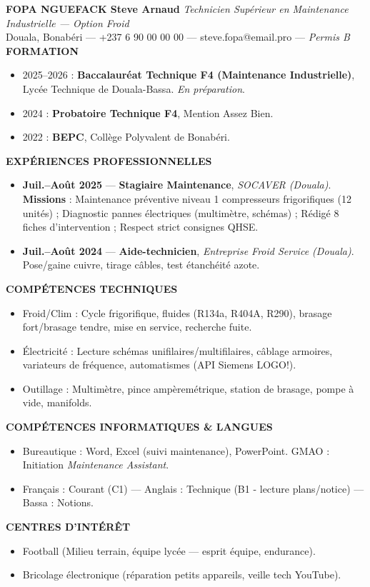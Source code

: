 \documentclass[11pt]{article}
\begin{document}
\begin{exemplebox}
\textbf{FOPA NGUEFACK Steve Arnaud} \hfill \textit{Technicien Supérieur en Maintenance Industrielle — Option Froid}\\
Douala, Bonabéri — +237 6 90 00 00 00 — steve.fopa@email.pro — \textit{Permis B} \\[4pt]
\textbf{FORMATION}
\begin{itemize}
\item 2025--2026 : \textbf{Baccalauréat Technique F4 (Maintenance Industrielle)}, Lycée Technique de Douala-Bassa. \textit{En préparation}.
\item 2024 : \textbf{Probatoire Technique F4}, Mention Assez Bien.
\item 2022 : \textbf{BEPC}, Collège Polyvalent de Bonabéri.
\end{itemize}
\textbf{EXPÉRIENCES PROFESSIONNELLES}
\begin{itemize}
\item \textbf{Juil.--Août 2025} — \textbf{Stagiaire Maintenance}, \textit{SOCAVER (Douala)}. \textbf{Missions} : Maintenance préventive niveau 1 compresseurs frigorifiques (12 unités) ; Diagnostic pannes électriques (multimètre, schémas) ; Rédigé 8 fiches d'intervention ; Respect strict consignes QHSE.
\item \textbf{Juil.--Août 2024} — \textbf{Aide-technicien}, \textit{Entreprise Froid Service (Douala)}. Pose/gaine cuivre, tirage câbles, test étanchéité azote.
\end{itemize}
\textbf{COMPÉTENCES TECHNIQUES}
\begin{itemize}
\item Froid/Clim : Cycle frigorifique, fluides (R134a, R404A, R290), brasage fort/brasage tendre, mise en service, recherche fuite.
\item Électricité : Lecture schémas unifilaires/multifilaires, câblage armoires, variateurs de fréquence, automatismes (API Siemens LOGO!).
\item Outillage : Multimètre, pince ampèremétrique, station de brasage, pompe à vide, manifolds.
\end{itemize}
\textbf{COMPÉTENCES INFORMATIQUES \& LANGUES}
\begin{itemize}
\item Bureautique : Word, Excel (suivi maintenance), PowerPoint. GMAO : Initiation \textit{Maintenance Assistant}.
\item Français : Courant (C1) — Anglais : Technique (B1 - lecture plans/notice) — Bassa : Notions.
\end{itemize}
\textbf{CENTRES D'INTÉRÊT}
\begin{itemize}
\item Football (Milieu terrain, équipe lycée — esprit équipe, endurance).
\item Bricolage électronique (réparation petits appareils, veille tech YouTube).
\end{itemize}
\end{exemplebox}
\end{document}
